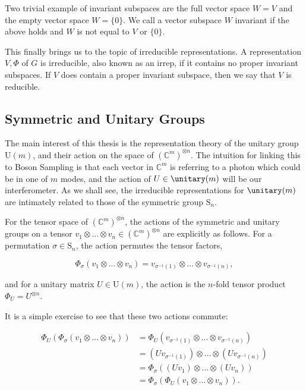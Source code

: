 Two trivial example of invariant subspaces are the full vector space $W=V$ and the empty vector space $W=\{0\}$. We call a vector subspace $W$ invariant if the above holds and $W$ is not equal to $V$ or $\{0\}$.

This finally brings us to the topic of irreducible representations. A representation $V, \Phi$ of $G$ is irreducible, also known as an irrep, if it contains no proper invariant subspaces. If $V$ does contain a proper invariant subspace, then we say that $V$ is reducible.

\subsection{Symmetric and Unitary Groups}

The main interest of this thesis is the representation theory of the unitary group U$(m)$, and their action on the space of $(\mathbb{C}^{m})^{\otimes n}$. The intuition for linking this to Boson Sampling is that each vector in $\mathbb{C}^m$ is referring to a photon which could be in one of $m$ modes, and the action of $U \in \unitary(m)$ will be our interferometer.
As we shall see, the irreducible representations for $\unitary(m)$ are intimately related to those of the symmetric group $\textrm{S}_n$.

For the tensor space of $(\mathbb{C}^{m})^{\otimes n}$, the actions of the symmetric and unitary groups on a tensor $v_1\otimes\dots\otimes v_n \in (\mathbb{C}^m)^{\otimes n}$ are explicitly as follows. 
For a permutation $\sigma \in \textrm{S}_n$, the action permutes the tensor factors,

\begin{equation}
\Phi_\sigma(v_1\otimes\dots\otimes v_n) = v_{\sigma^{-1}(1)}\otimes\dots\otimes v_{\sigma^{-1}(n)},
\end{equation}

\noindent and for a unitary matrix $U \in \textrm{U}(m)$, the action is the $n$-fold tensor product $\Phi_U = U^{\otimes n}$.

It is a simple exercise to see that these two actions commute:

\begin{align}
\Phi_U(\Phi_\sigma(v_1\otimes\dots\otimes v_n)) &= \Phi_U(v_{\sigma^{-1}(1)}\otimes\dots\otimes v_{\sigma^{-1}(n)})\\
&= (Uv_{\sigma^{-1}(1)})\otimes\dots\otimes(Uv_{\sigma^{-1}(n)})\\
&= \Phi_\sigma((Uv_1)\otimes\dots\otimes (Uv_n))\\
&= \Phi_\sigma(\Phi_U(v_1\otimes\dots\otimes v_n)).
\end{align}


